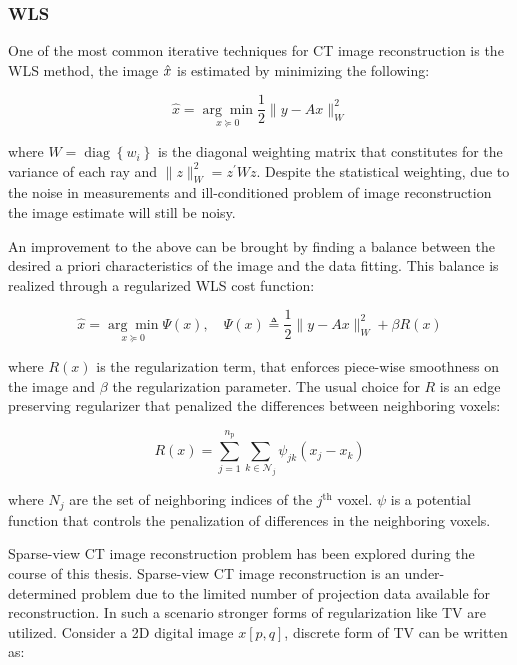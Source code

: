 \subsubsection{\ac{WLS}}

One of the most common iterative techniques for \ac{CT} image reconstruction is the \ac{WLS} method, the image $\hat{x}$ is estimated by minimizing the following:

\begin{equation}
\hat{x}=\underset{x \succeq 0}{\arg \min } \frac{1}{2}\|y-A x\|_{W}^{2}
\end{equation}

where $W=\operatorname{diag}\left\{w_{i}\right\}$ is the diagonal weighting matrix that constitutes for the variance of each ray and $\|z\|_{W}^{2}=z^{\prime} W z$. Despite the statistical weighting, due to the noise in measurements and ill-conditioned problem of image reconstruction the image estimate will still be noisy. 

An improvement to the above can be brought by finding a balance between the desired a priori characteristics of the image and the data fitting. This balance is realized through a regularized \ac{WLS} cost function:

\begin{equation}
\hat{x}=\underset{x \succeq 0}{\arg \min } \Psi(x), \quad \Psi(x) \triangleq \frac{1}{2}\|y-A x\|_{W}^{2}+\beta R(x)
\end{equation} 


where $R(x)$ is the regularization term, that enforces piece-wise smoothness on the image and $\beta$ the regularization parameter. The usual choice for $R$ is an edge preserving regularizer that penalized the differences between neighboring voxels:

\begin{equation}
R(x)=\sum_{j=1}^{n_{\mathrm{p}}} \sum_{k \in \mathcal{N}_{j}} \psi_{j k}\left(x_{j}-x_{k}\right)
\end{equation}    

where $N_j$ are the set of neighboring indices of the $j^\mathrm{th}$ voxel. $\psi$ is a potential function that controls the penalization of differences in the neighboring voxels.

Sparse-view \ac{CT} image reconstruction problem has been explored during the course of this thesis. Sparse-view \ac{CT} image reconstruction is an under-determined problem due to the limited number of projection data available for reconstruction. In such a scenario stronger forms of regularization like \ac{TV} are utilized. Consider a 2D digital image $x[p,q]$, discrete form of \ac{TV} can be written as:


